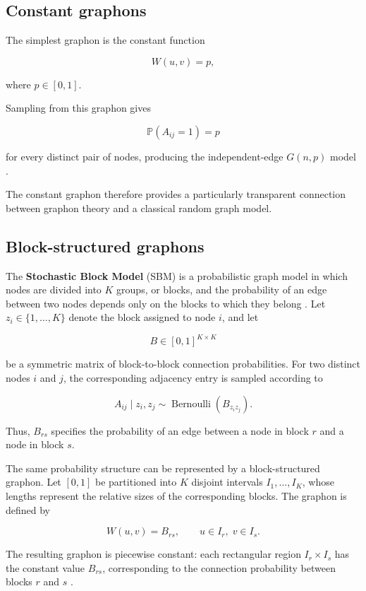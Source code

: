 \subsection{Constant graphons}
\label{subsec:constant_graphons}

The simplest graphon is the constant function

\[
W(u,v)=p,
\]

where \(p\in[0,1]\).

Sampling from this graphon gives

\[
\mathbb{P}(A_{ij}=1)=p
\]

for every distinct pair of nodes, producing the independent-edge \(G(n,p)\) model \cite{lovasz2006limits}.

The constant graphon therefore provides a particularly transparent connection between graphon theory and a classical random graph model.


\subsection{Block-structured graphons}
\label{subsec:block_graphons}

The \textbf{Stochastic Block Model} (SBM) is a probabilistic graph model in which nodes are divided into \(K\) groups, or blocks, and the probability of an edge between two nodes depends only on the blocks to which they belong \cite{holland1983stochastic}. Let \(z_i\in\{1,\ldots,K\}\) denote the block assigned to node \(i\), and let

\[
B\in[0,1]^{K\times K}
\]

be a symmetric matrix of block-to-block connection probabilities. For two distinct nodes \(i\) and \(j\), the corresponding adjacency entry is sampled according to

\[
A_{ij}\mid z_i,z_j
\sim
\operatorname{Bernoulli}\!\left(B_{z_i z_j}\right).
\]

Thus, \(B_{rs}\) specifies the probability of an edge between a node in block \(r\) and a node in block \(s\).

The same probability structure can be represented by a block-structured graphon. Let \([0,1]\) be partitioned into \(K\) disjoint intervals \(I_1,\ldots,I_K\), whose lengths represent the relative sizes of the corresponding blocks. The graphon is defined by

\[
W(u,v)=B_{rs},
\qquad
u\in I_r,\;v\in I_s.
\]

The resulting graphon is piecewise constant: each rectangular region \(I_r\times I_s\) has the constant value \(B_{rs}\), corresponding to the connection probability between blocks \(r\) and \(s\) \cite{lovasz2006limits}.

